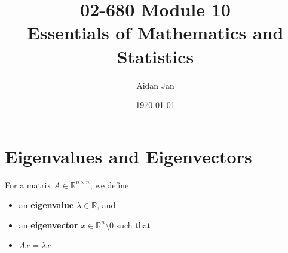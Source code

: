 \documentclass[10pt]{article}
\title{02-680 Module 10 \\ \large{Essentials of Mathematics and Statistics}}
\author{Aidan Jan}
\date{\today}
\begin{document}
\maketitle

\section*{Eigenvalues and Eigenvectors}
For a matrix $A \in \mathbb{R}^{n \times n}$, we define
\begin{itemize}
	\item an \textbf{eigenvalue} $\lambda \in \mathbb{R}$, and
	\item an \textbf{eigenvector} $x \in \mathbb{R}^n \setminus 0$ such that 
	\item $Ax = \lambda x$
\end{itemize}
\end{document}
